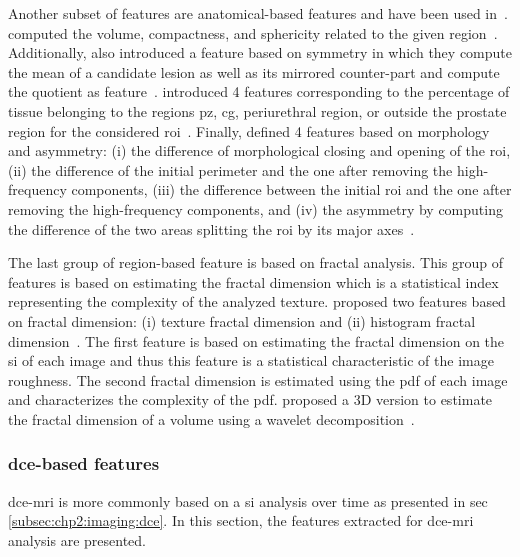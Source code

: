 Another subset of features are anatomical-based features and have been used in~\cite{Litjens2012,Litjens2014,Matulewicz2013,cameron2014multiparametric,cameron2016maps}.
\citeauthor{Litjens2012} computed the volume, compactness, and sphericity related to the given region~\cite{Litjens2012, Litjens2014}.
Additionally, \citeauthor{Litjens2014} also introduced a feature based on symmetry in which they compute the mean of a candidate lesion as well as its mirrored counter-part and compute the quotient as feature~\cite{Litjens2014}.
\citeauthor{Matulewicz2013} introduced 4 features corresponding to the percentage of tissue belonging to the regions \ac{pz}, \ac{cg}, periurethral region, or outside the prostate region for the considered \ac{roi}~\cite{Matulewicz2013}.
Finally, \citeauthor{cameron2016maps} defined 4 features based on morphology and asymmetry:
(i) the difference of morphological closing and opening of the \ac{roi}, (ii) the difference of the initial perimeter and the one after removing the high-frequency components, (iii) the difference between the initial \ac{roi} and the one after removing the high-frequency components, and (iv) the asymmetry by computing the difference of the two areas splitting the \ac{roi} by its major axes~\cite{cameron2014multiparametric,cameron2016maps}.

The last group of region-based feature is based on fractal analysis.
This group of features is based on estimating the fractal dimension which is a statistical index representing the complexity of the analyzed texture.
\citeauthor{Lv2009} proposed two features based on fractal dimension: (i) texture fractal dimension and (ii) histogram fractal dimension~\cite{Lv2009}.
The first feature is based on estimating the fractal dimension on the \ac{si} of each image and thus this feature is a statistical characteristic of the image roughness.
The second fractal dimension is estimated using the \ac{pdf} of each image and characterizes the complexity of the \ac{pdf}.
\citeauthor{Lopes2011} proposed a 3D version to estimate the fractal dimension of a volume using a wavelet decomposition~\cite{Lopes2011}.

\subsubsection{\acs*{dce}-based features}\label{subsubsec:chp3:img-clas:CADX-fea-dec:DCE-fea}

\ac{dce}-\ac{mri} is more commonly based on a \ac{si} analysis over time as presented in \acs{sec}\,\ref{subsec:chp2:imaging:dce}.
In this section, the features extracted for \ac{dce}-\ac{mri} analysis are presented.

